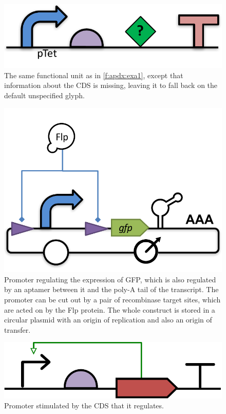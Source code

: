\begin{figure}[h!]
\includegraphics[scale=0.5]{figures/apdx-examples/apdx-exa10.pdf}
\caption{The same functional unit as in \ref{f:apdx:exa1}, except that information about the CDS is missing, leaving it to fall back on the default unspecified glyph.}
\label{f:apdx:exa10}
\end{figure}

\begin{figure}[h!]
\includegraphics[scale=0.5]{figures/apdx-examples/apdx-exa11.pdf}
\caption{Promoter regulating the expression of GFP, which is also regulated by an aptamer between it and the poly-A tail of the transcript. The promoter can be cut out by a pair of recombinase target sites, which are acted on by the Flp protein.  The whole construct is stored in a circular plasmid with an origin of replication and also an origin of transfer.}
\label{f:apdx:exa11}
\end{figure}

\begin{figure}[h!]
\includegraphics[scale=0.5]{figures/apdx-examples/apdx-exa12.pdf}
\caption{Promoter stimulated by the CDS that it regulates.}
\label{f:apdx:exa12}
\end{figure}

